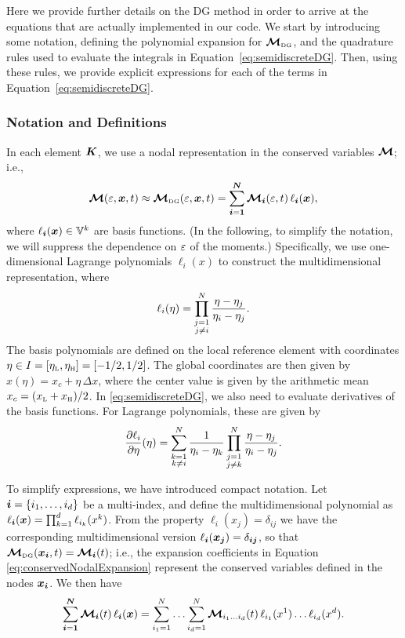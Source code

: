 \documentclass[10pt,preprint]{aastex}
\begin{document}
Here we provide further details on the DG method in order to arrive at the equations that are actually implemented in our code.  
We start by introducing some notation, defining the polynomial expansion for $\boldsymbol{\mathcal{M}}_{\mbox{\tiny DG}}$, and the quadrature rules used to evaluate the integrals in Equation~\eqref{eq:semidiscreteDG}.  
Then, using these rules, we provide explicit expressions for each of the terms in Equation~\eqref{eq:semidiscreteDG}.  

\subsubsection{Notation and Definitions}

In each element $\boldsymbol{K}$, we use a nodal representation in the conserved variables $\boldsymbol{\mathcal{M}}$; i.e.,
\begin{equation}
  \boldsymbol{\mathcal{M}}(\varepsilon,\boldsymbol{x},t)\approx
  \boldsymbol{\mathcal{M}}_{\mbox{\tiny DG}}(\varepsilon,\boldsymbol{x},t)=\sum_{\boldsymbol{i}=\boldsymbol{1}}^{\boldsymbol{N}}\boldsymbol{\mathcal{M}}_{\boldsymbol{i}}(\varepsilon,t)\,\ell_{\boldsymbol{i}}(\boldsymbol{x}),
  \label{eq:conservedNodalExpansion}
\end{equation}
where $\ell_{\boldsymbol{i}}(\boldsymbol{x})\in\mathbb{V}^{k}$ are basis functions.  
(In the following, to simplify the notation, we will suppress the dependence on $\varepsilon$ of the moments.)
Specifically, we use one-dimensional Lagrange polynomials $\ell_{i}(x)$ to construct the multidimensional representation, where
\begin{equation}
  \ell_{i}(\eta)=
  \prod_{\substack{j=1\\j\ne i}}^{N}\frac{\eta-\eta_{j}}{\eta_{i}-\eta_{j}}.  
\end{equation}
The basis polynomials are defined on the local reference element with coordinates $\eta\in I=[\eta_{\mbox{\tiny L}},\eta_{\mbox{\tiny H}}]=[-1/2,1/2]$.  
The global coordinates are then given by $x(\eta)=x_{c}+\eta\,\Delta x$, where the center value is given by the arithmetic mean $x_{c}=(x_{\mbox{\tiny L}}+x_{\mbox{\tiny H}})/2$.  
In \eqref{eq:semidiscreteDG}, we also need to evaluate derivatives of the basis functions.  
For Lagrange polynomials, these are given by
\begin{equation}
  \frac{\partial \ell_{i}}{\partial \eta}(\eta)
  =\sum_{\substack{k = 1 \\ k \ne i}}^{N}\frac{1}{\eta_{i}-\eta_{k}}
  \prod_{\substack{j=1 \\ j \ne k}}^{N}\frac{\eta-\eta_{j}}{\eta_{i}-\eta_{j}}.  
\end{equation}

To simplify expressions, we have introduced compact notation.  
Let $\boldsymbol{i}=\{i_{1},\ldots,i_{d}\}$ be a multi-index, and define the multidimensional polynomial as $\ell_{\boldsymbol{i}}(\boldsymbol{x})=\prod_{k=1}^{d}\ell_{i_{k}}(x^{k})$.  
From the property $\ell_{i}(x_{j})=\delta_{ij}$ we have the corresponding multidimensional version $\ell_{\boldsymbol{i}}(\boldsymbol{x}_{\boldsymbol{j}})=\delta_{\boldsymbol{i}\boldsymbol{j}}$, so that $\boldsymbol{\mathcal{M}}_{\mbox{\tiny DG}}(\boldsymbol{x}_{\boldsymbol{i}},t)=\boldsymbol{\mathcal{M}}_{\boldsymbol{i}}(t)$; i.e., the expansion coefficients in Equation \eqref{eq:conservedNodalExpansion} represent the conserved variables defined in the nodes $\boldsymbol{x}_{\boldsymbol{i}}$.  
We then have
\begin{equation}
  \sum_{\boldsymbol{i}=\boldsymbol{1}}^{\boldsymbol{N}}\boldsymbol{\mathcal{M}}_{\boldsymbol{i}}(t)\,\ell_{\boldsymbol{i}}(\boldsymbol{x})
  =\sum_{i_{1}=1}^{N}\ldots\sum_{i_{d}=1}^{N}\boldsymbol{\mathcal{M}}_{i_{1}\ldots i_{d}}(t)\,\ell_{i_{1}}(x^{1})\ldots\ell_{i_{d}}(x^{d}).  
\end{equation}
\end{document}
